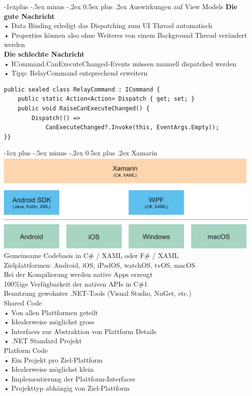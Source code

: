 \documentclass[10pt,landscape,a4paper]{article}
\makeatletter
\renewcommand{\section}{\@startsection{section}{1}{0mm}%
                                {-1ex plus -.5ex minus -.2ex}%
                                {0.5ex plus .2ex}%
                                {\normalfont\large\bfseries}}
\renewcommand{\subsection}{\@startsection{subsection}{2}{0mm}%
                                {-1explus -.5ex minus -.2ex}%
                                {0.5ex plus .2ex}%
                                {\normalfont\small\bfseries}}
\makeatother
\begin{document}
\begin{multicols*}{3}
\subsection{Auswirkungen auf View Models}
\textbf{Die gute Nachricht}\\
• Data Binding erledigt das Dispatching zum UI Thread automatisch\\
• Properties können also ohne Weiteres von einem Background Thread verändert werden\\
\textbf{Die schlechte Nachricht}\\
• ICommand.CanExecuteChanged-Events müssen manuell dispatched werden\\
• Tipp: RelayCommand entsprechend erweitern

\begin{verbatim}
public sealed class RelayCommand : ICommand {
    public static Action<Action> Dispatch { get; set; }
    public void RaiseCanExecuteChanged() {
        Dispatch(() =>
            CanExecuteChanged?.Invoke(this, EventArgs.Empty));
}}
\end{verbatim}

\section{Xamarin}
\includegraphics[scale=0.3]{images/Xamarin.PNG}
Gemeinsame Codebasis in C\# / XAML oder F\# / XAML\\
Zielplattformen: Android, iOS, iPadOS, watchOS, tvOS, macOS\\
Bei der Kompilierung werden native Apps erzeugt\\
100\%ige Verfügbarkeit der nativen APIs in C\#1\\
Benutzung gewohnter .NET-Tools (Visual Studio, NuGet, etc.)\\

Shared Code\\
• Von allen Plattformen geteilt\\
• Idealerweise möglichst gross\\
• Interfaces zur Abstraktion von Plattform Details\\
• .NET Standard Projekt\\
Platform Code\\
• Ein Projekt pro Ziel-Plattform\\
• Idealerweise möglichst klein\\
• Implementierung der Plattform-Interfaces\\
• Projekttyp abhängig von Ziel-Plattform


\end{multicols*}
\end{document}
